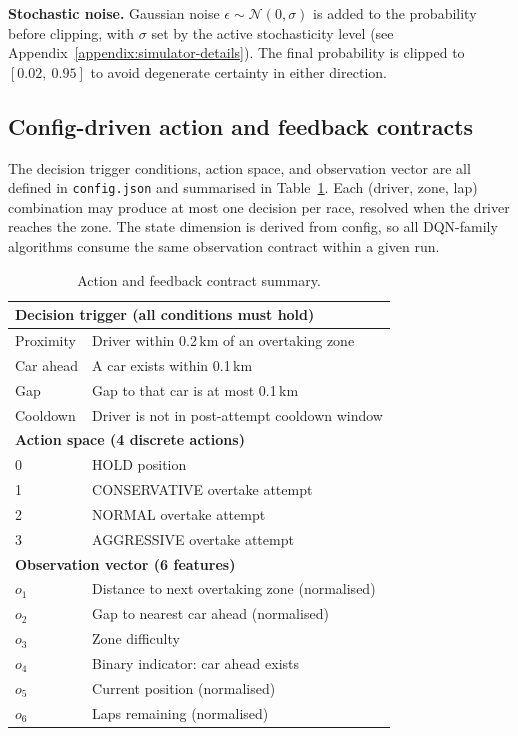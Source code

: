 \textbf{Stochastic noise.} Gaussian noise $\epsilon \sim \mathcal{N}(0, \sigma)$ is added to the probability before clipping, with $\sigma$ set by the active stochasticity level (see Appendix~\ref{appendix:simulator-details}). The final probability is clipped to $[0.02,\ 0.95]$ to avoid degenerate certainty in either direction.

\subsection{Config-driven action and feedback contracts}

The decision trigger conditions, action space, and observation vector are all defined in \texttt{config.json} and summarised in Table~\ref{tab:contracts}. Each (driver, zone, lap) combination may produce at most one decision per race, resolved when the driver reaches the zone. The state dimension is derived from config, so all DQN-family algorithms consume the same observation contract within a given run.

\begin{table}[htbp]
\centering
\small
\caption{Action and feedback contract summary.}
\label{tab:contracts}
\begin{tabular}{lp{8.5cm}}
\hline
\multicolumn{2}{l}{\textbf{Decision trigger (all conditions must hold)}} \\
\hline
Proximity   & Driver within 0.2\,km of an overtaking zone \\
Car ahead   & A car exists within 0.1\,km \\
Gap         & Gap to that car is at most 0.1\,km \\
Cooldown    & Driver is not in post-attempt cooldown window \\
\hline
\multicolumn{2}{l}{\textbf{Action space (4 discrete actions)}} \\
\hline
0 & HOLD position \\
1 & CONSERVATIVE overtake attempt \\
2 & NORMAL overtake attempt \\
3 & AGGRESSIVE overtake attempt \\
\hline
\multicolumn{2}{l}{\textbf{Observation vector (6 features)}} \\
\hline
$o_1$ & Distance to next overtaking zone (normalised) \\
$o_2$ & Gap to nearest car ahead (normalised) \\
$o_3$ & Zone difficulty \\
$o_4$ & Binary indicator: car ahead exists \\
$o_5$ & Current position (normalised) \\
$o_6$ & Laps remaining (normalised) \\
\hline
\end{tabular}
\end{table}

